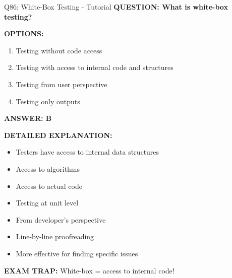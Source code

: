 \documentclass[8pt]{beamer}
\begin{document}
	\begin{frame}{Q86: White-Box Testing - Tutorial}
		\fontsize{6.5}{7.5}\selectfont
		\textbf{QUESTION: What is white-box testing?}
		
		\vspace{0.1cm}
		\textbf{OPTIONS:}
		\begin{enumerate}
			\item Testing without code access
			\item Testing with access to internal code and structures
			\item Testing from user perspective
			\item Testing only outputs
		\end{enumerate}
		
		\vspace{0.1cm}
		\textcolor{myblue}{\textbf{ANSWER: B}}
		
		\vspace{0.1cm}
		\textbf{DETAILED EXPLANATION:}
		\begin{itemize}
			\item Testers have access to internal data structures
			\item Access to algorithms
			\item Access to actual code
			\item Testing at unit level
			\item From developer's perspective
			\item Line-by-line proofreading
			\item More effective for finding specific issues
		\end{itemize}
		
		\vspace{0.1cm}
		\textcolor{myred}{\textbf{EXAM TRAP:}} White-box = \textcolor{myblue}{access to internal code}!
	\end{frame}
	
\end{document}
